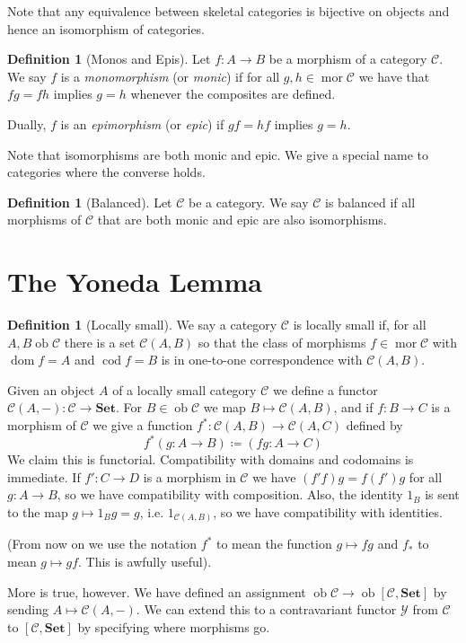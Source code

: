 \documentclass{report}
\newcommand{\mbold}[1]{\mathrm{\mathbf{#1}}}
\DeclareMathOperator{\ob}{ob}
\DeclareMathOperator{\mor}{mor}
\DeclareMathOperator{\dom}{dom}
\DeclareMathOperator{\cod}{cod}
\theoremstyle{definition}
\theoremstyle{plain}
\theoremstyle{definition}
\newtheorem{defn}[thm]{Definition}
\begin{document}
	 Note that any equivalence between skeletal categories is bijective on objects and hence an isomorphism of categories.
	 \begin{defn}[Monos and Epis]
	 	Let $f\colon A \to B$ be a morphism of a category $\mathcal{C}$. We say $f$ is a \emph{monomorphism} (or \emph{monic}) if for all $g,h\in\mor \mathcal{C}$ we have that $fg = fh$ implies $g= h$ whenever the composites are defined.
	 	
	 	Dually, $f$ is an \emph{epimorphism} (or \emph{epic}) if $gf = hf$ implies $g = h$.
	 \end{defn}
	 Note that isomorphisms are both monic and epic. We give a special name to categories where the converse holds.
	 \begin{defn}[Balanced]
	 	Let $\mathcal{C}$ be a category. We say $\mathcal{C}$ is balanced if all morphisms of $\mathcal{C}$ that are both monic and epic are also isomorphisms.
	 \end{defn}
	 \newpage
	 \section{The Yoneda Lemma}
	 \begin{defn}[Locally small]
	 	We say a category $\mathcal{C}$ is locally small if, for all $A,B\ob\mathcal{C}$ there is a set $\mathcal{C}(A,B)$ so that the class of morphisms $f\in\mor \mathcal{C}$ with $\dom f = A$ and $\cod f = B$ is in one-to-one correspondence with $\mathcal{C}(A,B)$. 
	 \end{defn}
	 Given an object $A$ of a locally small category $\mathcal{C}$ we define a functor $\mathcal{C}(A,-)\colon \mathcal{C} \to \mbold{Set}$. For $B\in\ob\mathcal{C}$ we map $B\mapsto \mathcal{C}(A,B)$, and if $f\colon B \to C$ is a morphism of $\mathcal{C}$ we give a function $f^*\colon \mathcal{C}(A,B) \to \mathcal{C}(A,C)$ defined by
	 \[
	 	f^*(g\colon A \to B) \coloneqq (fg\colon A \to C)
	 \]
	 We claim this is functorial. Compatibility with domains and codomains is immediate. If $f'\colon C \to D$ is a morphism in $\mathcal{C}$ we have $(f'f)g=f(f')g$ for all $g\colon A \to B$, so we have compatibility with composition. Also, the identity $1_B$ is sent to the map $g\mapsto 1_Bg = g$, i.e. $1_{\mathcal{C}(A,B)}$, so we have compatibility with identities.
	 
	 (From now on we use the notation $f^*$ to mean the function $g\mapsto fg$  and $f_*$ to mean $g\mapsto gf$. This is awfully useful).
	 
	 More is true, however. We have defined an assignment $\ob \mathcal{C} \to \ob[\mathcal{C}, \mbold{Set}]$ by sending $A \mapsto \mathcal{C}(A,-)$. We can extend this to a contravariant functor $\mathscr{Y}$ from $\mathcal{C}$ to $[\mathcal{C}, \mbold{Set}]$ by specifying where morphisms go. 
	 
\end{document}
